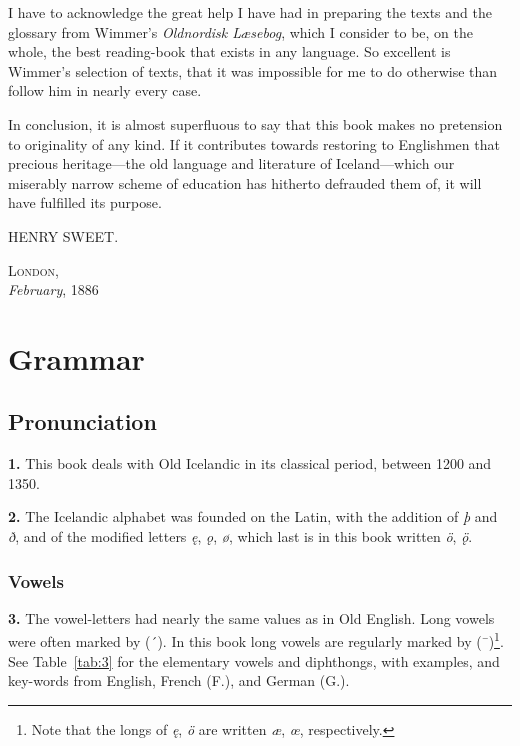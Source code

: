\documentclass[12pt,letterpaper]{book}
\newcommand\emptypage{\clearpage{\pagestyle{empty}\cleardoublepage}}
\begin{document}
I have to acknowledge the great help I have had in preparing the
texts and the glossary from Wimmer's \textit{Oldnordisk Læsebog}, which
I consider to be, on the whole, the best reading-book that exists
in any language.  So excellent is Wimmer's selection of texts,
that it was impossible for me to do otherwise than follow him in
nearly every case.

In conclusion, it is almost superfluous to say that this book
makes no pretension to originality of any kind.  If it
contributes towards restoring to Englishmen that precious
heritage---the old language and literature of Iceland---which our
miserably narrow scheme of education has hitherto defrauded them
of, it will have fulfilled its purpose.

\begin{flushright}
HENRY SWEET.
\end{flushright}

\textsc{London,}\\
\textit{February}, 1886

\tableofcontents{}

\emptypage

\mainmatter

\part{Grammar}
\thispagestyle{empty}

\emptypage

\chapter{Pronunciation}

\textbf{1.} This book deals with Old Icelandic in its classical period,
between 1200 and 1350.

\textbf{2.} The Icelandic alphabet was founded on the Latin, with the
addition of \textit{þ} and \textit{ð}, and of the modified letters \textit{ę},
\textit{ǫ}, \textit{ø}, which last is in this book written \textit{ö},
\textit{ǫ̈}.

\section{Vowels}

\textbf{3.} The vowel-letters had nearly the same values as in Old
English.  Long vowels were often marked by (´).  In this book
long vowels are regularly marked by (¯)\footnote{Note that the longs
of \textit{ę}, \textit{ö} are written \textit{æ}, \textit{œ}, respectively.}.
See Table~\ref{tab:3} for the elementary vowels and diphthongs, with
examples, and key-words from English, French (F.), and German (G.).
\end{document}
